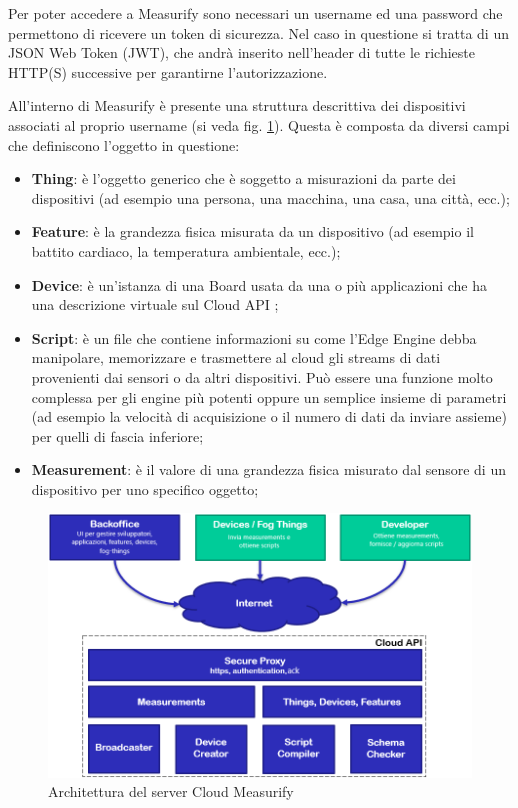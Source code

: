 Per poter accedere a Measurify sono necessari un username ed una password che permettono di ricevere un token di sicurezza. Nel caso in questione si tratta di un JSON Web Token (JWT), che andrà inserito nell'header di tutte le richieste HTTP(S) successive per garantirne l'autorizzazione.

All'interno di Measurify è presente una struttura descrittiva dei dispositivi associati al proprio username  (si veda fig. \ref{cloudAPI}). Questa è composta da diversi campi che definiscono l'oggetto in questione:

\begin{itemize}
	\item \textbf{Thing}: è  l'oggetto generico che è soggetto a misurazioni da parte dei dispositivi (ad esempio una persona, una macchina, una casa, una città, ecc.);
	\item \textbf{Feature}: è la grandezza fisica misurata da un dispositivo (ad esempio il battito cardiaco, la temperatura ambientale, ecc.);
	\item \textbf{Device}: è un'istanza di una Board usata da una o più applicazioni che
	ha una descrizione virtuale sul Cloud API ;
	\item \textbf{Script}: è un file che contiene informazioni su come l'Edge Engine debba manipolare, memorizzare e trasmettere al cloud gli streams di dati provenienti dai sensori o da altri dispositivi. Può essere una funzione molto complessa per gli engine più potenti oppure un semplice insieme di parametri (ad esempio la velocità di acquisizione o il numero di dati da inviare assieme) per quelli di fascia inferiore;
	\item \textbf{Measurement}: è il valore di una grandezza fisica misurato dal sensore
	di un dispositivo per uno specifico oggetto;
\end{itemize}

\begin{figure}[H]
	\centering
	\includegraphics[width=\linewidth]{pics/cloudAPI}
	\caption{Architettura del server Cloud Measurify}
	\label{cloudAPI}
\end{figure}

